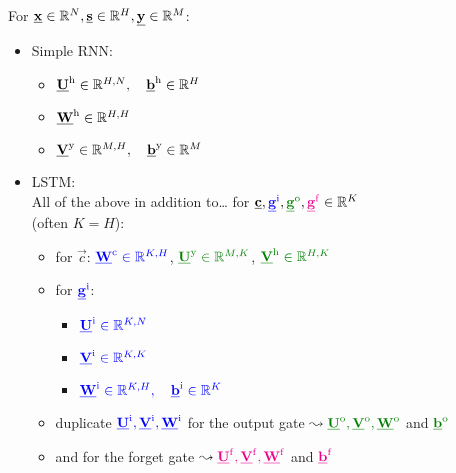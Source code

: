 \begin{frame}\frametitle{\subsecname}
		For $\vec x \in \R^N, \vec s \in \R^H, \vec y \in \R^M$:\\
		\begin{itemize}
		\item[]
			Simple RNN:\\
			\begin{itemize}
			\item $\vec U^{\mathrm{h}} \in \R^{H,N},\quad \vec b^{\mathrm{h}} \in \R^{H}$
			\item $\vec W^{\mathrm{h}} \in \R^{H,H}$
			\item $\vec V^{\mathrm{y}} \in \R^{M,H},\quad \vec b^{\mathrm{y}} \in \R^{M}$
			\end{itemize}
			\pause
			
		\item[]
			LSTM:\\
			All of the above in addition to\ldots
			for $\vec c, {\color{blue}\vec g^{\mathrm{i}}}, {\color{darkgreen}\vec g^{\mathrm{o}}}, {\color{magenta}\vec g^{\mathrm{f}}} \in \R^K$\\
			(often $K=H$):\\
			\pause
			\begin{itemize}
			\item for $\vec c$:
             $\color{blue}\vec W^{\mathrm{c}} \in \R^{K,H}$, 
			 $\color{darkgreen}\vec U^{\mathrm{y}} \in \R^{M,K}$,
			 $\color{darkgreen}\vec V^{\mathrm{h}} \in \R^{H,K}$
			\item[] for ${\color{blue}\vec g^{\mathrm{i}}}$:
            \begin{itemize}
                \item $\color{blue}\vec U^{\mathrm{i}} \in \R^{K,N}$
                \item $\color{blue}\vec V^{\mathrm{i}} \in \R^{K,K}$
                \item $\color{blue}\vec W^{\mathrm{i}} \in \R^{K,H}, \quad \vec b^{\mathrm{i}} \in \R^{K}$
			\end{itemize}
            \item duplicate $\color{blue}\vec U^{\mathrm{i}}, \color{blue}\vec V^{\mathrm{i}}, \color{blue}\vec W^{\mathrm{i}}$
			for the output gate $\leadsto \color{darkgreen}\vec U^{\mathrm{o}}, \color{darkgreen}\vec V^{\mathrm{o}}, \color{darkgreen}\vec W^{\mathrm{o}}$ and $\color{darkgreen}\vec b^{\mathrm{o}}$
			\item and for the forget gate $\leadsto \color{magenta}\vec U^{\mathrm{f}}, \color{magenta}\vec V^{\mathrm{f}}, \color{magenta}\vec W^{\mathrm{f}}$ and $\color{magenta}\vec b^{\mathrm{f}}$
			\end{itemize}
		\end{itemize}
		
       
\end{frame}

